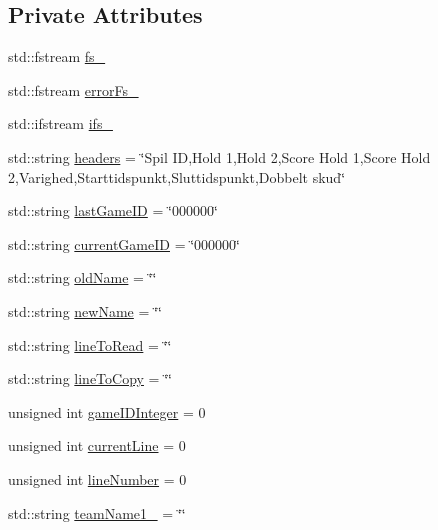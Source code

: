 \subsection*{Private Attributes}
\begin{DoxyCompactItemize}
\item 
std\+::fstream \hyperlink{class_website_score_handling_a67456f438fa2687fe1a68872862de7c2}{fs\+\_\+}
\item 
std\+::fstream \hyperlink{class_website_score_handling_a5096933970404b633247f7975e71b643}{error\+Fs\+\_\+}
\item 
std\+::ifstream \hyperlink{class_website_score_handling_a6132d55c59920eb1a420f059e89a5f7d}{ifs\+\_\+}
\item 
std\+::string \hyperlink{class_website_score_handling_a9f8de26004558e2655831583db758797}{headers} = \char`\"{}Spil ID,Hold 1,Hold 2,Score Hold 1,Score Hold 2,Varighed,Starttidspunkt,Sluttidspunkt,Dobbelt skud\char`\"{}
\item 
std\+::string \hyperlink{class_website_score_handling_a5b110dd9bccb8d6216d2d982b763a9c7}{last\+Game\+ID} = \char`\"{}000000\char`\"{}
\item 
std\+::string \hyperlink{class_website_score_handling_afd9be3d660d8e4b80431850583c9eaff}{current\+Game\+ID} = \char`\"{}000000\char`\"{}
\item 
std\+::string \hyperlink{class_website_score_handling_a6e8dbd075951cece59dbb1870a569600}{old\+Name} = \char`\"{}\char`\"{}
\item 
std\+::string \hyperlink{class_website_score_handling_a0156acf4513ff569b91933a3f4fc7bfa}{new\+Name} = \char`\"{}\char`\"{}
\item 
std\+::string \hyperlink{class_website_score_handling_aa806a4566986529065ae5f5197c5872a}{line\+To\+Read} = \char`\"{}\char`\"{}
\item 
std\+::string \hyperlink{class_website_score_handling_aaea05f7ab2dcf417a8da33c20abd590d}{line\+To\+Copy} = \char`\"{}\char`\"{}
\item 
unsigned int \hyperlink{class_website_score_handling_abc7ee63b8d8c718ce460da3635d90d25}{game\+I\+D\+Integer} = 0
\item 
unsigned int \hyperlink{class_website_score_handling_a3cde6ae01393db61e049cee7eb0db7a9}{current\+Line} = 0
\item 
unsigned int \hyperlink{class_website_score_handling_a535fb9000802fd431fc7eb63973f45d7}{line\+Number} = 0
\item 
std\+::string \hyperlink{class_website_score_handling_aff47f8c9e251e9d88ae20e6d48d28985}{team\+Name1\+\_\+} = \char`\"{}\char`\"{}

\end{DoxyCompactItemize}
